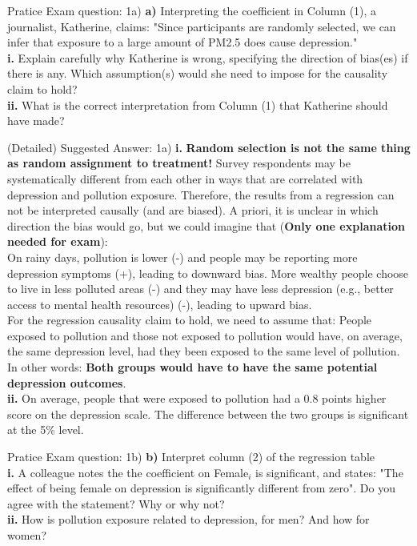 \documentclass[11pt]{beamer}
\begin{document}
\begin{frame}{Pratice Exam question: 1a)}
   \textbf{a)} Interpreting the coefficient in Column (1), a journalist, Katherine, claims: "Since participants are randomly selected, we can infer that exposure to a large amount of PM2.5 does cause depression." \\
\textbf{i.} Explain carefully why Katherine is wrong, specifying the direction of bias(es) if there is any. Which assumption(s) would she need to impose for the causality claim to hold? \\
\textbf{ii.} What is the correct interpretation from Column (1) that Katherine should have made?
\end{frame}


\begin{frame}{(Detailed) Suggested Answer: 1a)}
\footnotesize{
\textbf{i.} \textbf{ Random selection is not the same thing as random assignment to treatment!} Survey respondents may be systematically different from each other in ways that are correlated with depression and pollution exposure. Therefore, the results from a regression can not be interpreted causally (and are biased). A priori, it is unclear in which direction the bias would go, but we could imagine that (\textbf{Only one explanation needed for exam}):\\
On rainy days, pollution is lower (-) and people may be reporting more depression symptoms (+), leading to downward bias.
More wealthy people choose to live in less polluted areas (-) and they may have less depression (e.g., better access to mental health resources) (-), leading to upward bias.\\

For the regression causality claim to hold, we need to assume that:
People exposed to pollution and those not exposed to pollution would have, on average, the same depression level, had they been exposed to the same level of pollution. In other words: \textbf{Both groups would have to have the same potential depression outcomes}.\\

\textbf{ii.} On average, people that were exposed to pollution had a 0.8 points higher score on the depression scale. The difference between the two groups is significant at the 5\% level.
}
\end{frame}




\begin{frame}{Pratice Exam question: 1b)}
   \textbf{b)} Interpret column (2) of the regression table \\
\textbf{i.} A colleague notes the the coefficient on Female$_i$ is significant, and states: "The effect of being female on depression is significantly different from zero". Do you agree with the statement? Why or why not? \\
\textbf{ii.} How is pollution exposure related to depression, for men? And how for women?
\end{frame}
\end{document}
